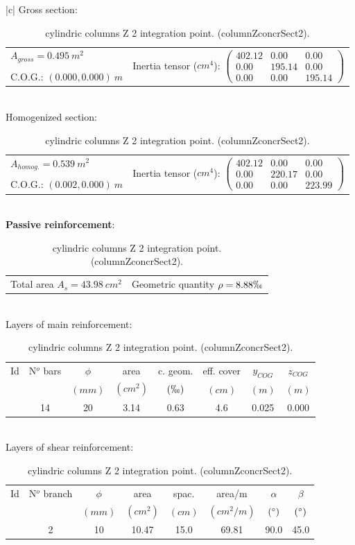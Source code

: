 \begin{table}
\begin{center}
\begin{tabular}{|c|}
\hline
Gross section:\\
\hline
\begin{tabular}{ll}
$A_{gross}= 0.495\ m^2$ & \multirow{3}{*}{Inertia tensor ($cm^4$): $ \left( \begin{array}{ccc}402.12 & 0.00 & 0.00 \\ 0.00 & 195.14 &  0.00 \\ 0.00 &  0.00 & 195.14 \end{array} \right)$} \\
& \\
C.O.G.: $(0.000,0.000)\ m$  & \\
\end{tabular} \\
\hline
Homogenized section:\\
\hline
\begin{tabular}{ll}
$A_{homog.}= 0.539\ m^2$ & \multirow{3}{*}{Inertia tensor ($cm^4$): $ \left( \begin{array}{ccc}402.12 & 0.00 & 0.00 \\ 0.00 & 220.17 &  0.00 \\ 0.00 &  0.00 & 223.99 \end{array} \right)$} \\
& \\
C.O.G.: $(0.002,0.000)\ m$  & \\
\end{tabular} \\
\hline
\textbf{Passive reinforcement}:\\
\hline
\begin{tabular}{ll}
Total area $A_s=43.98\ cm^2$ & Geometric quantity $\rho= 8.88\permil$\\
\end{tabular} \\
\hline
Layers of main reinforcement:\\
\hline
\begin{tabular}{cccccccc}
Id & N$^o$ bars & $\phi$ & area & c. geom. & eff. cover & $y_{COG}$ & $z_{COG}$\\
 &  & $(mm)$ & $(cm^2)$ & $(\permil)$ & $(cm)$ & $(m)$ & $(m)$\\
\hline
 & 14 & 20 &  3.14 & 0.63 &  4.6 & 0.025 & 0.000\\
\end{tabular} \\
\hline
Layers of shear reinforcement:\\
\hline
\begin{tabular}{cccccccc}
Id & N$^o$ branch & $\phi$ & area & spac. & area/m & $\alpha$ & $\beta$\\
 &  & $(mm)$ & $(cm^2)$ & $(cm)$ & $(cm^2/m)$ & $( \degree)$ & $( \degree)$\\
\hline
 & 2 & 10 & 10.47 & 15.0 & 69.81 & 90.0 & 45.0\\
\end{tabular} \\
\hline
\end{tabular}
\end{center}
\caption{cylindric columns Z 2 integration point. (columnZconcrSect2).} \label{tb_columnZconcrSect2}
\end{table}
